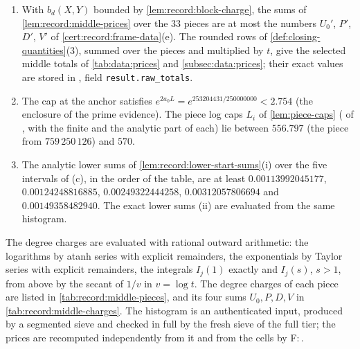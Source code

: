 \begin{certificate}
\begin{enumerate}[label=(\alph*)]
\begin{center}
\begin{tabular}{@{}llll@{}}
 $[2^{36},2^{40})$ & $512$ & $22\,(0\text{--}175)$, $21\,(176\text{--}403)$, $20\,(404\text{--}511)$ & $1.9325\cdot10^{-5}$\\
 $[2^{40},2^{45})$ & $640$ & $20\,(0\text{--}141)$, $19\,(142\text{--}418)$, $18\,(419\text{--}639)$ & $1.7392\cdot10^{-5}$\\
 $[2^{45},P_3)$ & $306$ & $18\,(0\text{--}86)$, $17\,(87\text{--}305)$ & $1.5460\cdot10^{-5}$\\
 \bottomrule
 \end{tabular}
 \end{center}
 Each $n_j$ equals $\lfloor L/\log x_{j+1}\rfloor$, computed as the floor of a
 certified lower bound of the quotient; in all $1950$ cells $n_j\log x_{j+1}\le569.9947476$, so
 $L-n_j\log x_{j+1}>0.00525$, and every cell price is at most
 $\Pi_j\le e^{2a_0L}$.
\item With $b_d(X,Y)$ bounded by \cref{lem:record:block-charge}, the sums of
 \cref{lem:record:middle-prices} over the $33$ pieces are at most the numbers
 $U_0'$, $P'$, $D'$, $V'$ of \cref{cert:record:frame-data}(e). The rounded rows
 of \cref{def:closing-quantities}(3), summed over the pieces and multiplied by
 $t$, give the selected middle totals of \cref{tab:data:prices} and
 \cref{subsec:data:prices}; their exact values are stored in
 , field
 \texttt{result.raw\_totals}.
\item The cap at the anchor satisfies
 $e^{2a_0L}=e^{253204431/250000000}<2.754$ (the enclosure
  of the prime evidence). The piece log caps $L_i$ of
 \cref{lem:piece-caps} ( of
 , with the finite and the analytic part of each) lie
 between $556.797$ (the piece from $759\,250\,126$) and $570$.
\item The analytic lower sums of \cref{lem:record:lower-start-sums}(i) over
 the five intervals of (c), in the order of the table, are at least
 $0.00113992045177$, $0.00124248816885$, $0.00249322444258$,
 $0.00312057806694$ and $0.00149358482940$. The exact lower sums (ii) are
 evaluated from the same histogram.
\end{enumerate}
The degree charges are evaluated with rational outward arithmetic: the
logarithms by atanh series with explicit remainders, the exponentials by
Taylor series with explicit remainders, the integrals $I_j(1)$ exactly and
$I_j(s)$, $s>1$, from above by the secant of $1/v$ in $v=\log t$. The degree
charges of each piece are listed in
\cref{tab:record:middle-pieces}, and its four sums
$U_0,P,D,V$ in \cref{tab:record:middle-charges}. The histogram is an
authenticated input, produced by a segmented sieve and checked in full by the
fresh sieve of the full tier; the prices are recomputed independently from it
and from the cells by F:\,.
\end{certificate}

